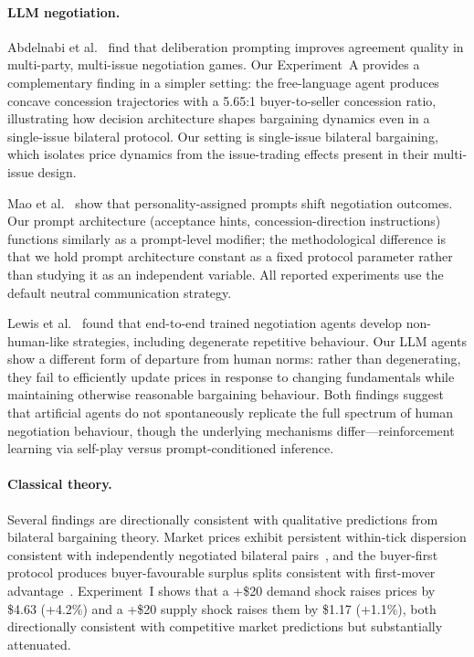 \paragraph{LLM negotiation.}
Abdelnabi et al.~\cite{abdelnabi2024llmdeliberation} find that deliberation prompting improves agreement quality in multi-party, multi-issue negotiation games.  Our Experiment~A provides a complementary finding in a simpler setting: the free-language agent produces concave concession trajectories with a 5.65:1 buyer-to-seller concession ratio, illustrating how decision architecture shapes bargaining dynamics even in a single-issue bilateral protocol.  Our setting is single-issue bilateral bargaining, which isolates price dynamics from the issue-trading effects present in their multi-issue design.

Mao et al.~\cite{mao2024personalities} show that personality-assigned prompts shift negotiation outcomes.  Our prompt architecture (acceptance hints, concession-direction instructions) functions similarly as a prompt-level modifier; the methodological difference is that we hold prompt architecture constant as a fixed protocol parameter rather than studying it as an independent variable.  All reported experiments use the default neutral communication strategy.

Lewis et al.~\cite{lewis2017dealornodeal} found that end-to-end trained negotiation agents develop non-human-like strategies, including degenerate repetitive behaviour.  Our LLM agents show a different form of departure from human norms: rather than degenerating, they fail to efficiently update prices in response to changing fundamentals while maintaining otherwise reasonable bargaining behaviour.  Both findings suggest that artificial agents do not spontaneously replicate the full spectrum of human negotiation behaviour, though the underlying mechanisms differ---reinforcement learning via self-play versus prompt-conditioned inference.

\paragraph{Classical theory.}
Several findings are directionally consistent with qualitative predictions from bilateral bargaining theory.  Market prices exhibit persistent within-tick dispersion consistent with independently negotiated bilateral pairs~\cite{rubinstein1985}, and the buyer-first protocol produces buyer-favourable surplus splits consistent with first-mover advantage~\cite{rubinstein1982}.  Experiment~I shows that a +\$20 demand shock raises prices by \$4.63 (+4.2\%) and a +\$20 supply shock raises them by \$1.17 (+1.1\%), both directionally consistent with competitive market predictions but substantially attenuated.

